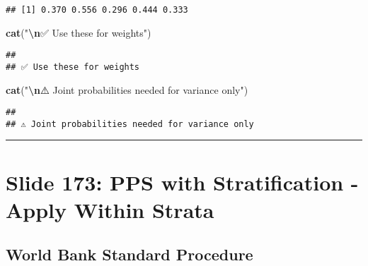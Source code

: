 \documentclass[
]{article}
\newenvironment{Shaded}{\begin{snugshade}}{\end{snugshade}}
\newcommand{\DecValTok}[1]{\textcolor[rgb]{0.00,0.00,0.81}{#1}}
\newcommand{\FunctionTok}[1]{\textcolor[rgb]{0.13,0.29,0.53}{\textbf{#1}}}
\newcommand{\NormalTok}[1]{#1}
\newcommand{\SpecialCharTok}[1]{\textcolor[rgb]{0.81,0.36,0.00}{\textbf{#1}}}
\newcommand{\StringTok}[1]{\textcolor[rgb]{0.31,0.60,0.02}{#1}}
\begin{document}
\begin{Shaded}
\end{Shaded}

\begin{verbatim}
## [1] 0.370 0.556 0.296 0.444 0.333
\end{verbatim}

\begin{Shaded}
\begin{Highlighting}[]
\FunctionTok{cat}\NormalTok{(}\StringTok{"}\SpecialCharTok{\textbackslash{}n}\StringTok{✅ Use these for weights"}\NormalTok{)}
\end{Highlighting}
\end{Shaded}

\begin{verbatim}
## 
## ✅ Use these for weights
\end{verbatim}

\begin{Shaded}
\begin{Highlighting}[]
\FunctionTok{cat}\NormalTok{(}\StringTok{"}\SpecialCharTok{\textbackslash{}n}\StringTok{⚠️ Joint probabilities needed for variance only"}\NormalTok{)}
\end{Highlighting}
\end{Shaded}

\begin{verbatim}
## 
## ⚠️ Joint probabilities needed for variance only
\end{verbatim}

\begin{center}\rule{0.5\linewidth}{0.5pt}\end{center}

\section{Slide 173: PPS with Stratification - Apply Within
Strata}\label{slide-173-pps-with-stratification---apply-within-strata}

\subsection{World Bank Standard
Procedure}\label{world-bank-standard-procedure}
\end{document}
